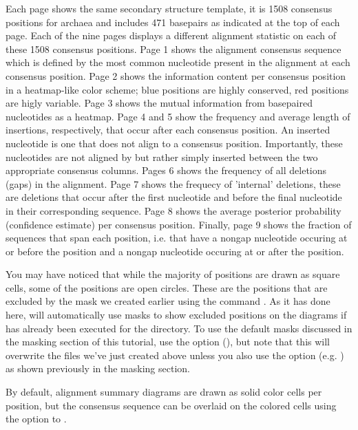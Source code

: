Each page shows the same secondary structure template, it is 1508
consensus positions for archaea and includes 471 basepairs as
indicated at the top of each page. Each of the nine pages displays a
different alignment statistic on each of these 1508 consensus
positions. Page 1 shows the alignment consensus sequence which is
defined by the most common nucleotide present in the alignment
 at each consensus position. Page 2 shows the
information content per consensus position in a heatmap-like color
scheme; blue positions are highly conserved, red positions are higly
variable. Page 3 shows the mutual information from basepaired
nucleotides as a heatmap. Page 4 and 5 show the frequency and average
length of insertions, respectively, that occur after each consensus
position. An inserted nucleotide is one that does not align to a
consensus position. Importantly, these nucleotides are not aligned by
 but rather simply inserted between the two
appropriate consensus columns. Pages 6 shows the frequency of all
deletions (gaps) in the alignment. Page 7 shows the frequecy of
'internal' deletions, these are deletions that occur after the first
nucleotide and before the final nucleotide in their corresponding
sequence. Page 8 shows the average posterior probability (confidence
estimate) per consensus position. Finally, page 9 shows the fraction
of sequences that span each position, i.e. that have a nongap
nucleotide occuring at or before the position and a nongap nucleotide
occuring at or after the position.

You may have noticed that while the majority of positions are drawn as
square cells, some of the positions are open circles. These are the
positions that are excluded by the mask we created earlier using the
command . As it has done here, 
 will automatically use masks to show excluded
positions on the diagrams if  has already been executed
for the directory. To use the default masks discussed in the masking
section of this tutorial, use the  option (), but note that this will overwrite the files we've just
created above unless you also use the  option
(e.g. ) as shown previously in
the masking section.

By default, alignment summary diagrams are drawn as solid
color cells per position, but the consensus sequence can be overlaid
on the colored cells using the  option to .

